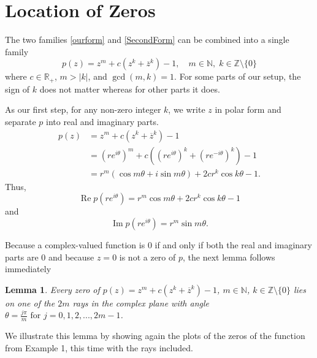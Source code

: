 \documentclass{amsart}
\renewcommand{\Re}{\operatorname{Re}}
\renewcommand{\Im}{\operatorname{Im}}
\newtheorem{lemma}{Lemma}
\theoremstyle{definition}
\theoremstyle{remark}
\begin{document}
\section{Location of Zeros}

The two families \eqref{ourform} and \eqref{SecondForm} can be combined into a single family
\begin{equation}\label{combinedfam}
    p(z) = z^m+c (z^k +\overline{z}^k)-1, \quad m \in \mathbb{N}, \; k \in \mathbb{Z} \setminus\{0\}
\end{equation}
where $c \in \mathbb{R}_+$, $m>|k|$, and $\gcd(m,k)=1$. For some parts of our setup, the sign of $k$ does not matter whereas for other parts it does.  

As our first step, for any non-zero integer $k$, we write $z$ in polar form and separate $p$ into real and imaginary parts.
\begin{align*}
p(z) &= z^m+c(z^k+\overline{z}^k)-1 \\
&=  (re^{i\theta})^m+c\left((re^{i\theta})^k+(re^{-i\theta})^k\right)-1 \\
&= r^m(\cos{m\theta}+i\sin{m\theta})+2cr^k\cos{k\theta}-1. 
\end{align*}
Thus, 
\[
\Re p(re^{i\theta})  = r^m\cos{m\theta} + 2cr^k\cos k\theta - 1
\]
and
\[
\Im p(re^{i\theta})  = r^m\sin m\theta .
\]


Because a complex-valued function is 0 if and only if both the real and imaginary parts are 0 and because $z=0$ is not a zero of $p$, the next lemma follows immediately %

\begin{lemma}\label{lemma1}
Every zero of $p(z) = z^m+c(z^k+\overline{z}^k)-1$, $m \in \mathbb{N}$, $k \in \mathbb{Z} \setminus\{0\}$ lies on one of the $2m$ rays in the complex plane with angle $\theta=\frac{j\pi}{m} \text{ for } j=0,1,2,...,2m-1$. 
\end{lemma}


We illustrate this lemma by showing again the plots of the zeros of the function from Example 1, this time with the rays included. 
\end{document}
